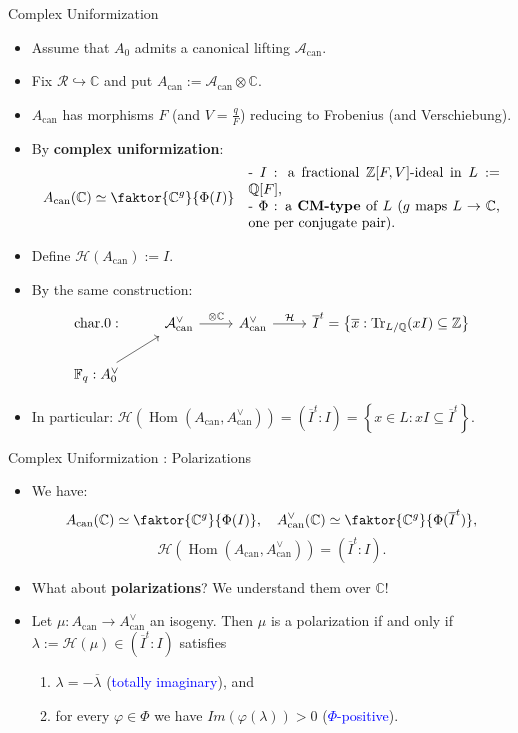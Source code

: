 \documentclass[usenames,dvipsnames]{beamer}
\def\Q{\mathbb{Q}}
\def\Z{\mathbb{Z}}
\def\C{\mathbb{C}}
\def\F{\mathbb{F}}
\DeclareMathOperator{\Hom}{Hom}
\DeclareMathOperator{\Tr}{Tr}
\newcommand{\cH}{{\mathcal H}}
\newcommand{\vphi}{\varphi}
\newcommand{\set}[1]{\left\lbrace#1\right\rbrace }
\newcommand{\Acan}{\mathcal{A}_{\mathrm{can}}}
\newcommand{\AcanC}{A_{\mathrm{can}}}
\newcommand{\blue}[1]{\textcolor{blue}{#1}}
\begin{document}
\begin{frame}{ Complex Uniformization }
    \begin{itemize}
    \item Assume that $A_0$ admits a canonical lifting $\Acan$.
\pause   
    \item Fix $\mathcal{R} \hookrightarrow \C$ and put $\AcanC:=\Acan \otimes \C$.
\pause
    \item $\AcanC$ has morphisms $F$ (and $V=\frac{q}{F}$) reducing to Frobenius (and Verschiebung).
\pause
    \item By {\bf complex uniformization}:
    \[ \AcanC(\C) \simeq \faktor{\C^g}{\Phi(I)} \quad 
    \parbox{18em}{ - $I$ : a fractional $\Z[F,V]$-ideal in $L:=\Q[F]$,  \\
                  - $\Phi$ : a {\bf CM-type} of $L$ ($g$ maps $L\to \C$, one per conjugate pair). } \]
\pause
    \vspace{-1.3em}
    \item Define $\cH(\AcanC):=I$.
\pause
    \item By the same construction:
    \[
    \begin{tikzcd}[ampersand replacement=\&] %
    \text{char.}0 : \& \Acan^\vee \arrow[r, "\otimes \C"] \& \AcanC^\vee \arrow[r, "\mathcal{H}"] \& \overline{I}^t =\set{ \overline{x} : \Tr_{L/\Q}(xI)\subseteq \Z }\\
    \F_q : A_0^\vee \arrow[ur] \& \& \&
    \end{tikzcd}    
    \]
\pause
    \vspace{-1.5em}
    \item In particular: $\cH(\Hom(\AcanC,\AcanC^\vee)) = (\overline{I}^t:I) = \set{ x \in L : xI \subseteq \overline{I}^t }$.
	\end{itemize}
\end{frame}

\begin{frame}{ Complex Uniformization : Polarizations }
    \begin{itemize}
    \item We have: 
    \[ \AcanC(\C) \simeq \faktor{\C^g}{\Phi(I)}, \quad \AcanC^\vee(\C) \simeq \faktor{\C^g}{\Phi(\overline{I}^t)},\]
    \[ \cH(\Hom(\AcanC,\AcanC^\vee)) = (\overline{I}^t:I). \]
\pause         
    \item What about {\bf polarizations}? We understand them over $\C$!
\pause    
    \item Let $\mu:\AcanC\to \AcanC^\vee$ an isogeny. Then $\mu$ is a polarization if and only if
	       $\lambda := \cH(\mu) \in (\overline{I}^t:I)$ satisfies
	       \begin{enumerate}
\pause 
	       \item $\lambda = - \overline{\lambda}$ (\blue{totally imaginary}), and
\pause 
	       \item for every $\vphi\in \Phi$ we have $Im(\vphi(\lambda))>0$  (\blue{$\Phi$-positive}).
           \end{enumerate}
\pause            	  
	\end{itemize}
\end{frame}
\end{document}
